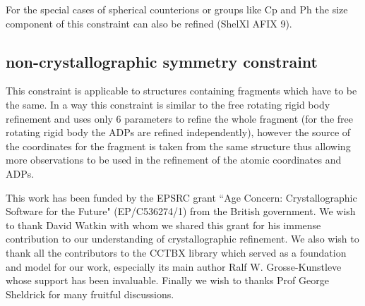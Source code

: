 \documentclass[pdf]{iucr}
\begin{document}
For the special cases of spherical counterions or groups like Cp and Ph the size component of this constraint can also be refined (ShelXl AFIX 9).

\subsection{non-crystallographic symmetry constraint}
This constraint is applicable to structures containing fragments which have to be the same. In a way this constraint is similar to the free rotating rigid body refinement and uses only 6 parameters to refine the whole fragment (for the free rotating rigid body the ADPs are refined independently), however the source of the coordinates for the fragment is taken from the same structure thus allowing more observations to be used in the refinement of the atomic coordinates and ADPs. 


This work has been funded by the EPSRC grant ``Age Concern: Crystallographic Software for the Future" (EP/C536274/1) from the British government. We wish to thank David Watkin with whom we shared this grant for his immense contribution to our understanding of crystallographic refinement. We also wish to thank all the contributors to the CCTBX library which served as a foundation and model for our work, especially its main author Ralf W. Grosse-Kunstleve whose support has been invaluable. Finally we wish to thanks Prof George Sheldrick for many fruitful discussions.

\end{document}
